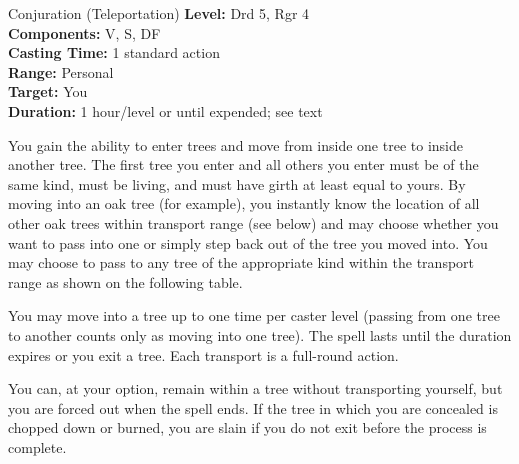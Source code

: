 {Conjuration (Teleportation)}
{
	\textbf{Level:}
	Drd 5, Rgr 4\\
	\textbf{Components:}
	V, S, DF\\
	\textbf{Casting Time:}
	1 standard action\\
	\textbf{Range:}
	Personal\\
	\textbf{Target:}
	You\\
	\textbf{Duration:}
	1 hour/level or until expended; see text\\
}
{


	You gain the ability to enter trees and move from inside one tree to inside another tree. The first tree you enter and all others you enter must be of the same kind, must be living, and must have girth at least equal to yours. By moving into an oak tree (for example), you instantly know the location of all other oak trees within transport range (see below) and may choose whether you want to pass into one or simply step back out of the tree you moved into. You may choose to pass to any tree of the appropriate kind within the transport range as shown on the following table.

	You may move into a tree up to one time per caster level (passing from one tree to another counts only as moving into one tree). The spell lasts until the duration expires or you exit a tree. Each transport is a full-round action.

	You can, at your option, remain within a tree without transporting yourself, but you are forced out when the spell ends. If the tree in which you are concealed is chopped down or burned, you are slain if you do not exit before the process is complete.

}

